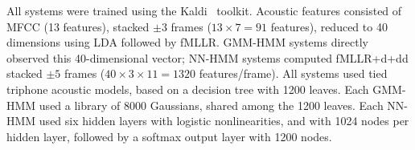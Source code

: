 All systems were trained using the Kaldi~\cite{Kaldi2011}
toolkit. Acoustic features consisted of MFCC (13
features), stacked $\pm 3$ frames ($13\times 7=91$ features),
reduced to 40 dimensions using LDA followed by fMLLR.  GMM-HMM
systems directly observed this 40-dimensional vector; NN-HMM systems
computed fMLLR+d+dd stacked $\pm 5$ frames ($40\times 3\times
11=1320$ features/frame).  All systems used tied triphone acoustic
models, based on a decision tree with 1200 leaves.  Each GMM-HMM
used a library of 8000 Gaussians, shared among the 1200 leaves.
Each NN-HMM used six hidden layers with logistic nonlinearities, and
with 1024 nodes per hidden layer, followed by a softmax output layer
with 1200 nodes.
  


